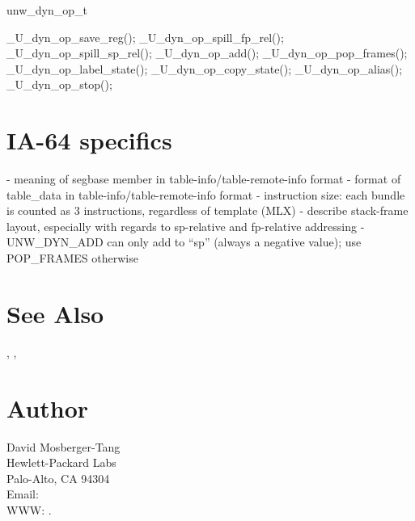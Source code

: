 \documentclass{article}
\begin{document}
unw\_dyn\_op\_t

\_U\_dyn\_op\_save\_reg();
\_U\_dyn\_op\_spill\_fp\_rel();
\_U\_dyn\_op\_spill\_sp\_rel();
\_U\_dyn\_op\_add();
\_U\_dyn\_op\_pop\_frames();
\_U\_dyn\_op\_label\_state();
\_U\_dyn\_op\_copy\_state();
\_U\_dyn\_op\_alias();
\_U\_dyn\_op\_stop();

\section{IA-64 specifics}

- meaning of segbase member in table-info/table-remote-info format
- format of table\_data in table-info/table-remote-info format
- instruction size: each bundle is counted as 3 instructions, regardless
  of template (MLX)
- describe stack-frame layout, especially with regards to sp-relative
  and fp-relative addressing
- UNW\_DYN\_ADD can only add to ``sp'' (always a negative value); use
  POP\_FRAMES otherwise

\section{See Also}

,
,

\section{Author}

\noindent
David Mosberger-Tang\\
Hewlett-Packard Labs\\
Palo-Alto, CA 94304\\
Email: \\
WWW: .
\LatexManEnd
\end{document}
